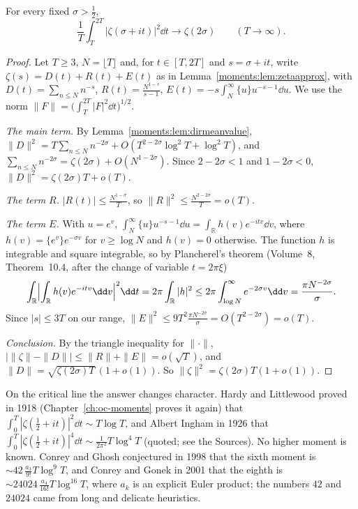 \begin{theorem}\label{moments:thm:meansquare}
For every fixed $\sigma>\frac12$,
\[
\frac1T\int_T^{2T}|\zeta(\sigma+it)|^2\dd t\longrightarrow\zeta(2\sigma)\qquad(T\to\infty).
\]
\end{theorem}
\begin{proof}
Let $T\ge3$, $N=\lfloor T\rfloor$ and, for $t\in[T,2T]$ and $s=\sigma+it$, write $\zeta(s)=D(t)+R(t)+E(t)$ as in Lemma~\ref{moments:lem:zetaapprox}, with
$D(t)=\sum_{n\le N}n^{-s}$, $R(t)=\frac{N^{1-s}}{s-1}$, $E(t)=-s\int_N^\infty\{u\}u^{-s-1}\dd u$. We use the norm $\|F\|=\bigl(\int_T^{2T}|F|^2\dd t\bigr)^{1/2}$.

\emph{The main term.} By Lemma~\ref{moments:lem:dirmeanvalue}, $\|D\|^2=T\sum_{n\le N}n^{-2\sigma}+O(T^{2-2\sigma}\log^2T+\log^2T)$, and
$\sum_{n\le N}n^{-2\sigma}=\zeta(2\sigma)+O(N^{1-2\sigma})$. Since $2-2\sigma<1$ and $1-2\sigma<0$, $\|D\|^2=\zeta(2\sigma)T+o(T)$.

\emph{The term $R$.} $|R(t)|\le\frac{N^{1-\sigma}}T$, so $\|R\|^2\le\frac{N^{2-2\sigma}}T=o(T)$.

\emph{The term $E$.} With $u=e^v$, $\int_N^\infty\{u\}u^{-s-1}\dd u=\int_{\mathbb R}h(v)e^{-itv}\dd v$, where $h(v)=\{e^v\}e^{-\sigma v}$ for $v\ge\log N$ and $h(v)=0$
otherwise. The function $h$ is integrable and square integrable, so by Plancherel's theorem (Volume~8, Theorem~10.4, after the change of variable $t=2\pi\xi$)
\[
\int_{\mathbb R}\Bigl|\int_{\mathbb R}h(v)e^{-itv}\dd v\Bigr|^2\dd t=2\pi\int_{\mathbb R}|h|^2\le2\pi\int_{\log N}^\infty e^{-2\sigma v}\dd v=\frac{\pi N^{-2\sigma}}\sigma.
\]
Since $|s|\le3T$ on our range, $\|E\|^2\le9T^2\frac{\pi N^{-2\sigma}}\sigma=O(T^{2-2\sigma})=o(T)$.

\emph{Conclusion.} By the triangle inequality for $\|\cdot\|$, $\bigl|\|\zeta\|-\|D\|\bigr|\le\|R\|+\|E\|=o(\sqrt T)$, and $\|D\|=\sqrt{\zeta(2\sigma)T}\,(1+o(1))$. So
$\|\zeta\|^2=\zeta(2\sigma)T(1+o(1))$.
\end{proof}

On the critical line the answer changes character. Hardy and Littlewood proved in 1918 (Chapter~\ref{ch:oc-moments} proves it again) that $\int_0^T|\zeta(\frac12+it)|^2\dd t\sim T\log T$, and Albert
Ingham in 1926 that $\int_0^T|\zeta(\frac12+it)|^4\dd t\sim\frac1{2\pi^2}T\log^4T$ (quoted; see the Sources). No higher moment is known. Conrey and Ghosh conjectured in 1998 that
the sixth moment is $\sim42\,\frac{a_3}{9!}T\log^9T$, and Conrey and Gonek in 2001 that the eighth is $\sim24024\,\frac{a_4}{16!}T\log^{16}T$, where $a_k$ is
an explicit Euler product; the numbers $42$ and $24024$ came from long and delicate heuristics.


